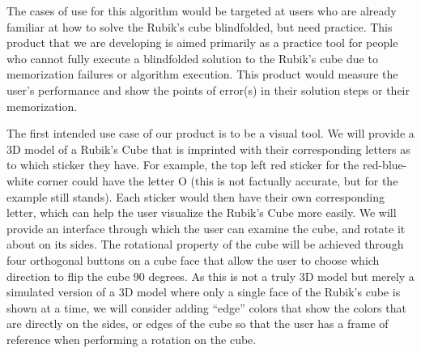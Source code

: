 \documentclass[12pt]{article}
\begin{document}
\par
The cases of use for this algorithm would be targeted at users who are already familiar at how to solve the Rubik’s cube blindfolded, but need practice. This product that we are developing is aimed primarily as a practice tool for people who cannot fully execute a blindfolded solution to the Rubik’s cube due to memorization failures or algorithm execution. This product would measure the user’s performance and show the points of error(s) in their solution steps or their memorization. \\

\par
The first intended use case of our product is to be a visual tool. We will provide a 3D model of a Rubik’s Cube that is imprinted with their corresponding letters as to which sticker they have. For example, the top left red sticker for the red-blue-white corner could have the letter O (this is not factually accurate, but for the example still stands). Each sticker would then have their own corresponding letter, which can help the user visualize the Rubik’s Cube more easily. We will provide an interface through which the user can examine the cube, and rotate it about on its sides. The rotational property of the cube will be achieved through four orthogonal buttons on a cube face that allow the user to choose which direction to flip the cube 90 degrees. As this is not a truly 3D model but merely a simulated version of a 3D model where only a single face of the Rubik’s cube is shown at a time, we will consider adding “edge” colors that show the colors that are directly on the sides, or edges of the cube so that the user has a frame of reference when performing a rotation on the cube. \\
\end{document}
